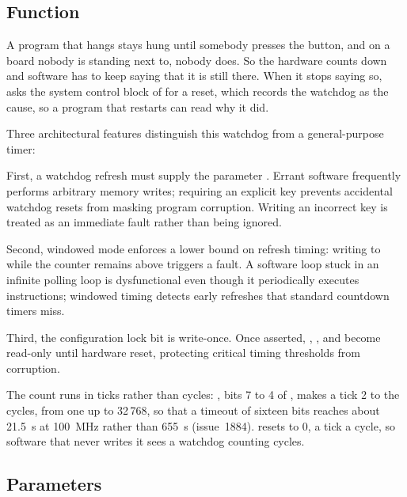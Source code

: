
%
{}

\subsection*{Function}

A program that hangs stays hung until somebody presses the button, and
on a board nobody is standing next to, nobody does. So the hardware
counts down and software has to keep saying that it is still there.
When it stops saying so,  asks the system control block of
 for a reset, which records the watchdog as the cause, so
a program that restarts can read why it did.

Three architectural features distinguish this watchdog from a general-purpose timer:

First, a watchdog refresh must supply the parameter . Errant
software frequently performs arbitrary memory writes; requiring an explicit key
prevents accidental watchdog resets from masking program corruption. Writing an
incorrect key is treated as an immediate fault rather than being ignored.

Second, windowed mode enforces a lower bound on refresh timing: writing to
 while the counter remains above  triggers a fault. A
software loop stuck in an infinite polling loop is dysfunctional even though it
periodically executes instructions; windowed timing detects early refreshes that
standard countdown timers miss.

Third, the configuration lock bit is write-once. Once asserted, ,
, and  become read-only until hardware reset, protecting
critical timing thresholds from corruption.

The count runs in ticks rather than cycles: , bits 7 to 4
of , makes a tick 2 to the  cycles, from one up to 32\,768, so
that a timeout of sixteen bits reaches about 21.5~s at 100~MHz rather
than 655~\textmu s (issue~1884).  resets to 0, a tick a
cycle, so software that never writes it sees a watchdog counting
cycles.

\subsection*{Parameters}

